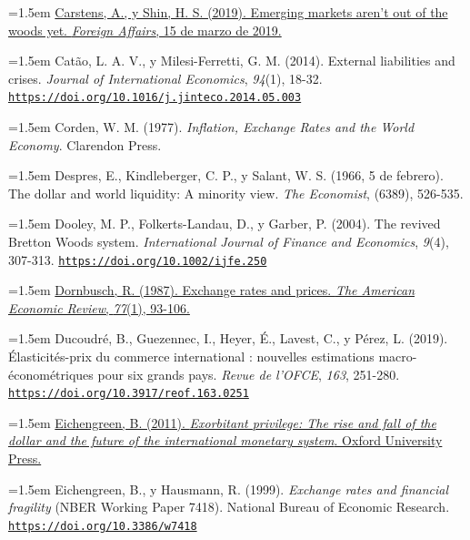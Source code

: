 \documentclass[10pt,a4paper]{article}
\begin{document}
\noindent\hangindent=1.5em \href{https://www.foreignaffairs.com/world/emerging-markets-arent-out-woods-yet}{Carstens, A., y Shin, H. S. (2019). Emerging markets aren't out of the woods yet. \textit{Foreign Affairs}, 15 de marzo de 2019.}

\noindent\hangindent=1.5em Catão, L. A. V., y Milesi-Ferretti, G. M. (2014). External liabilities and crises. \textit{Journal of International Economics}, \textit{94}(1), 18-32. \href{https://doi.org/10.1016/j.jinteco.2014.05.003}{\nolinkurl{https://doi.org/10.1016/j.jinteco.2014.05.003}}

\noindent\hangindent=1.5em Corden, W. M. (1977). \textit{Inflation, Exchange Rates and the World Economy}. Clarendon Press.

\noindent\hangindent=1.5em Despres, E., Kindleberger, C. P., y Salant, W. S. (1966, 5 de febrero). The dollar and world liquidity: A minority view. \textit{The Economist}, (6389), 526-535.

\noindent\hangindent=1.5em Dooley, M. P., Folkerts-Landau, D., y Garber, P. (2004). The revived Bretton Woods system. \textit{International Journal of Finance and Economics}, \textit{9}(4), 307-313. \href{https://doi.org/10.1002/ijfe.250}{\nolinkurl{https://doi.org/10.1002/ijfe.250}}

\noindent\hangindent=1.5em \href{https://ideas.repec.org/a/aea/aecrev/v77y1987i1p93-106.html}{Dornbusch, R. (1987). Exchange rates and prices. \textit{The American Economic Review}, \textit{77}(1), 93-106.}

\noindent\hangindent=1.5em Ducoudré, B., Guezennec, I., Heyer, É., Lavest, C., y Pérez, L. (2019). Élasticités-prix du commerce international : nouvelles estimations macro-économétriques pour six grands pays. \textit{Revue de l'OFCE}, \textit{163}, 251-280. \href{https://doi.org/10.3917/reof.163.0251}{\nolinkurl{https://doi.org/10.3917/reof.163.0251}}

\noindent\hangindent=1.5em \href{https://global.oup.com/academic/product/exorbitant-privilege-9780199753789}{Eichengreen, B. (2011). \textit{Exorbitant privilege: The rise and fall of the dollar and the future of the international monetary system}. Oxford University Press.}

\noindent\hangindent=1.5em Eichengreen, B., y Hausmann, R. (1999). \textit{Exchange rates and financial fragility} (NBER Working Paper 7418). National Bureau of Economic Research. \href{https://doi.org/10.3386/w7418}{\nolinkurl{https://doi.org/10.3386/w7418}}
\end{document}
